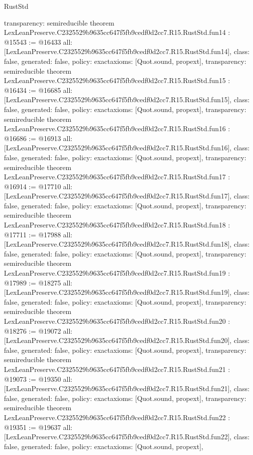 \begin{lexlean}{RustStd}
\begin{coremodule}
{  transparency: semireducible
}
theorem LexLeanPreserve.C2325529b9635cc647f5fb9cedf0d2cc7.R15.RustStd.fun14 : @15543 := @16433 {
  all: [LexLeanPreserve.C2325529b9635cc647f5fb9cedf0d2cc7.R15.RustStd.fun14],
  class: false,
  generated: false,
  policy: exact{axioms: [Quot.sound, propext]},
  transparency: semireducible
}
theorem LexLeanPreserve.C2325529b9635cc647f5fb9cedf0d2cc7.R15.RustStd.fun15 : @16434 := @16685 {
  all: [LexLeanPreserve.C2325529b9635cc647f5fb9cedf0d2cc7.R15.RustStd.fun15],
  class: false,
  generated: false,
  policy: exact{axioms: [Quot.sound, propext]},
  transparency: semireducible
}
theorem LexLeanPreserve.C2325529b9635cc647f5fb9cedf0d2cc7.R15.RustStd.fun16 : @16686 := @16913 {
  all: [LexLeanPreserve.C2325529b9635cc647f5fb9cedf0d2cc7.R15.RustStd.fun16],
  class: false,
  generated: false,
  policy: exact{axioms: [Quot.sound, propext]},
  transparency: semireducible
}
theorem LexLeanPreserve.C2325529b9635cc647f5fb9cedf0d2cc7.R15.RustStd.fun17 : @16914 := @17710 {
  all: [LexLeanPreserve.C2325529b9635cc647f5fb9cedf0d2cc7.R15.RustStd.fun17],
  class: false,
  generated: false,
  policy: exact{axioms: [Quot.sound, propext]},
  transparency: semireducible
}
theorem LexLeanPreserve.C2325529b9635cc647f5fb9cedf0d2cc7.R15.RustStd.fun18 : @17711 := @17988 {
  all: [LexLeanPreserve.C2325529b9635cc647f5fb9cedf0d2cc7.R15.RustStd.fun18],
  class: false,
  generated: false,
  policy: exact{axioms: [Quot.sound, propext]},
  transparency: semireducible
}
theorem LexLeanPreserve.C2325529b9635cc647f5fb9cedf0d2cc7.R15.RustStd.fun19 : @17989 := @18275 {
  all: [LexLeanPreserve.C2325529b9635cc647f5fb9cedf0d2cc7.R15.RustStd.fun19],
  class: false,
  generated: false,
  policy: exact{axioms: [Quot.sound, propext]},
  transparency: semireducible
}
theorem LexLeanPreserve.C2325529b9635cc647f5fb9cedf0d2cc7.R15.RustStd.fun20 : @18276 := @19072 {
  all: [LexLeanPreserve.C2325529b9635cc647f5fb9cedf0d2cc7.R15.RustStd.fun20],
  class: false,
  generated: false,
  policy: exact{axioms: [Quot.sound, propext]},
  transparency: semireducible
}
theorem LexLeanPreserve.C2325529b9635cc647f5fb9cedf0d2cc7.R15.RustStd.fun21 : @19073 := @19350 {
  all: [LexLeanPreserve.C2325529b9635cc647f5fb9cedf0d2cc7.R15.RustStd.fun21],
  class: false,
  generated: false,
  policy: exact{axioms: [Quot.sound, propext]},
  transparency: semireducible
}
theorem LexLeanPreserve.C2325529b9635cc647f5fb9cedf0d2cc7.R15.RustStd.fun22 : @19351 := @19637 {
  all: [LexLeanPreserve.C2325529b9635cc647f5fb9cedf0d2cc7.R15.RustStd.fun22],
  class: false,
  generated: false,
  policy: exact{axioms: [Quot.sound, propext]},
}
\end{coremodule}
\end{lexlean}
